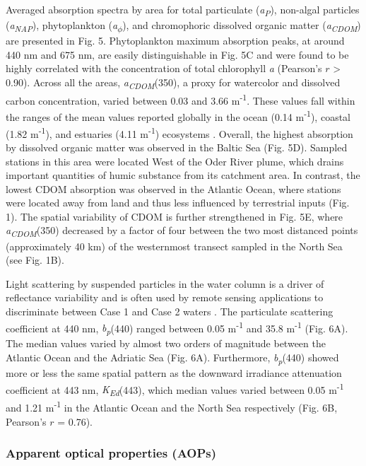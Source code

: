 \documentclass[essd, manuscript]{copernicus}
\begin{document}
Averaged absorption spectra by area for total particulate (\textit{a\textsubscript{P}}), non-algal particles (\textit{a\textsubscript{NAP}}), phytoplankton (\textit{a\textsubscript{$\phi$}}), and chromophoric dissolved organic matter (\textit{a\textsubscript{CDOM}}) are presented in Fig. 5. Phytoplankton maximum absorption peaks, at around 440 nm and 675 nm, are easily distinguishable in Fig. 5C and were found to be highly correlated with the concentration of total chlorophyll \textit{a} (Pearson's $r$ > 0.90). Across all the areas, \textit{a\textsubscript{CDOM}}(350), a proxy for watercolor and dissolved carbon concentration, varied between 0.03 and 3.66 m\textsuperscript{-1}. These values fall within the ranges of the mean values reported globally in the ocean (0.14 m\textsuperscript{-1}), coastal (1.82 m\textsuperscript{-1}), and estuaries (4.11 m\textsuperscript{-1}) ecosystems \citep{Massicotte2017}. Overall, the highest absorption by dissolved organic matter was observed in the Baltic Sea (Fig. 5D). Sampled stations in this area were located West of the Oder River plume, which drains important quantities of humic substance from its catchment area. In contrast, the lowest CDOM absorption was observed in the Atlantic Ocean, where stations were located away from land and thus less influenced by terrestrial inputs (Fig. 1). The spatial variability of CDOM is further strengthened in Fig. 5E, where \textit{a\textsubscript{CDOM}}(350) decreased by a factor of four between the two most distanced points (approximately 40 km) of the westernmost transect sampled in the North Sea (see Fig. 1B).

Light scattering by suspended particles in the water column is a driver of reflectance variability and is often used by remote sensing applications to discriminate between Case 1 and Case 2 waters \citep{Sathyendranath2000, Morel2006}. The particulate scattering coefficient at 440 nm, \textit{b\textsubscript{p}}(440) ranged between 0.05 m\textsuperscript{-1} and 35.8 m\textsuperscript{-1} (Fig. 6A). The median values varied by almost two orders of magnitude between the Atlantic Ocean and the Adriatic Sea (Fig. 6A). Furthermore, \textit{b\textsubscript{p}}(440) showed more or less the same spatial pattern as the downward irradiance attenuation coefficient at 443 nm, \textit{K\textsubscript{Ed}}(443), which median values varied between 0.05 m\textsuperscript{-1} and 1.21 m\textsuperscript{-1} in the Atlantic Ocean and the North Sea respectively (Fig. 6B, Pearson's $r$ = 0.76).

\subsubsection{Apparent optical properties (AOPs)}
\end{document}

